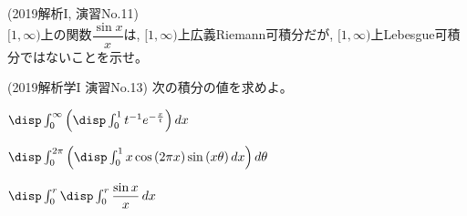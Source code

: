 \begin{egprob} (2019解析I, 演習No.11)\\
$[1,\infty)$上の関数$\dfrac{\sin{x}}{x}$は, $[1,\infty)$上広義Riemann可積分だが, $[1,\infty)$上Lebesgue可積分ではないことを示せ。
\end{egprob}
\begin{egans}



\end{egans}
\dotfill
\begin{egprob} (2019解析学I 演習No.13)
次の積分の値を求めよ。
\ben
\item $\disp\int_{0}^{\infty} \left( \disp\int_{0}^{1} t^{-1}e^{-\frac{x}{t}} \right) dx$
\item $\disp\int_{0}^{2\pi} \left( \disp\int_{0}^{1} x\cos{(2\pi x)}\sin{(x\theta)} \,dx \right) d\theta$\\
\item $\disp\int_{0}^{r} \disp\int_{0}^{r} \dfrac{\sin{x}}{x}\, dx$
\een
\end{egprob}
